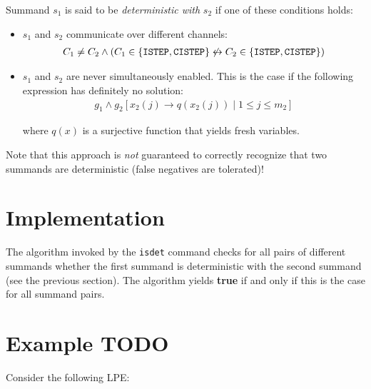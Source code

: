 Summand $s_1$ is said to be \emph{deterministic with} $s_2$ if one of these conditions holds:

\begin{itemize}
\item $s_1$ and $s_2$ communicate over different channels:
\begin{align*}
C_1 \neq C_2 \land (C_1 \in \{\texttt{ISTEP}{}, \texttt{CISTEP}{}\} \not\leftrightarrow C_2 \in \{\texttt{ISTEP}{}, \texttt{CISTEP}{}\})
\end{align*}

\item $s_1$ and $s_2$ are never simultaneously enabled.
This is the case if the following expression has definitely no solution:
\begin{align*}
g_1 \land g_2[ x_2(j) \rightarrow q(x_2(j)) \;|\; 1 \leq j \leq m_2 ]
\end{align*}

where $q(x)$ is a surjective function that yields fresh variables.
\end{itemize}

Note that this approach is \emph{not} guaranteed to correctly recognize that two summands are deterministic (false negatives are tolerated)!

\section{Implementation}

The algorithm invoked by the \texttt{isdet} command checks for all pairs of different summands whether the first summand is deterministic with the second summand (see the previous section).
The algorithm yields \textbf{true} if and only if this is the case for all summand pairs.

%

\section{Example TODO}

Consider the following LPE:

